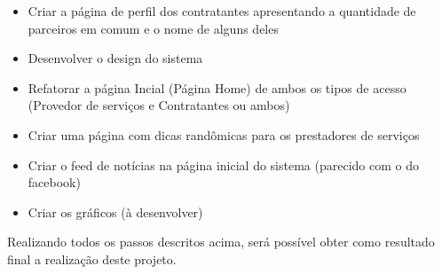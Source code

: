 \begin{itemize}
		\item Criar a página de perfil dos contratantes apresentando a quantidade de parceiros em comum e o nome de alguns deles
		\item Desenvolver o design do sistema
		\item Refatorar a página Incial (Página Home) de ambos os tipos de acesso (Provedor de serviços e Contratantes ou ambos)
		\item Criar uma página com dicas randômicas para os prestadores de serviços
		\item Criar o feed de notícias na página inicial do sistema (parecido com o do facebook)
		\item Criar os gráficos (à desenvolver)	
\end{itemize}

\par Realizando todos os passos descritos acima, será possível obter como resultado final a realização deste projeto.






